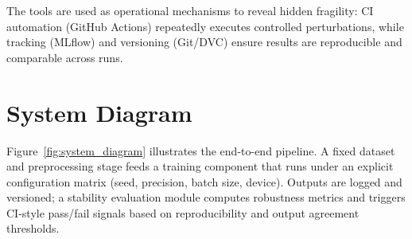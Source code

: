 \documentclass[11pt]{article}
\begin{document}
The tools are used as operational mechanisms to reveal hidden fragility: CI automation (GitHub Actions) repeatedly executes controlled perturbations, while tracking (MLflow) and versioning (Git/DVC) ensure results are reproducible and comparable across runs.

\section*{System Diagram}
Figure~\ref{fig:system_diagram} illustrates the end-to-end pipeline. A fixed dataset and preprocessing stage feeds a training component that runs under an explicit configuration matrix (seed, precision, batch size, device). Outputs are logged and versioned; a stability evaluation module computes robustness metrics and triggers CI-style pass/fail signals based on reproducibility and output agreement thresholds.
\end{document}
